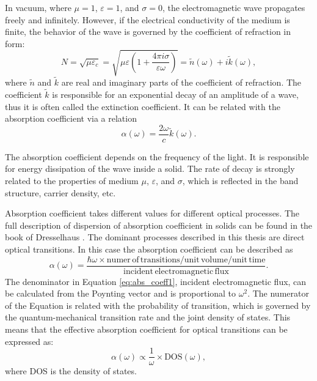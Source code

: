 \documentclass[titlepage,a4paper]{book}
\begin{document}
In vacuum, where $\mu = 1$, $\varepsilon = 1$, and $\sigma = 0$, the electromagnetic wave propagates freely and infinitely. However, if the electrical conductivity of the medium is finite, the behavior of the wave is governed by the coefficient of refraction in form:
\begin{equation}
\label{eq:Solution_K6}
N = \sqrt{\mu\varepsilon_c} = \sqrt{\mu\varepsilon \left(1 + \frac{4\pi i \sigma}{\varepsilon \omega} \right)} = \tilde{n}(\omega) + i\tilde{k}(\omega),
\end{equation}
where $\tilde{n}$ and $\tilde{k}$ are real and imaginary parts of the coefficient of refraction. The coefficient $\tilde{k}$ is responsible for an exponential decay of an amplitude of a wave, thus it is often called the extinction coefficient. It can be related with the absorption coefficient via a relation
\begin{equation}
\label{eq:Solution_K7}
\alpha (\omega) = \frac{2\omega}{c} \tilde{k}(\omega).
\end{equation}

The absorption coefficient depends on the frequency of the light. It is responsible for energy dissipation of the wave inside a solid. The rate of decay is strongly related to the properties of medium $\mu$, $\varepsilon$, and $\sigma$, which is reflected in the band structure, carrier density, etc.

Absorption coefficient takes different values for different optical processes. The full description of dispersion of absorption coefficient in solids can be found in the book of Dresselhaus \cite{Dresselhaus}. The dominant processes described in this thesis are direct optical transitions. In this case the absorption coefficient can be described as
\begin{equation}
\label{eq:abs_coeff1}
\alpha (\omega) = \frac{\hbar\omega \times \mathrm{numer\, of\, transitions/unit\, volume/unit\, time}}{\mathrm{incident\, electromagnetic\, flux}}.
\end{equation}
The denominator in Equation \ref{eq:abs_coeff1}, incident electromagnetic flux, can be calculated from the Poynting vector and is proportional to $\omega^2$. The numerator of the Equation is related with the probability of transition, which is governed by the quantum-mechanical transition rate and the joint density of states. This means that the effective absorption coefficient for optical transitions can be expressed as:
\begin{equation}
\label{eq:abs_coeff1}
\alpha (\omega) \propto \frac{1}{\omega} \times \mathrm{DOS}(\omega),
\end{equation}
where DOS is the density of states.
\end{document}
